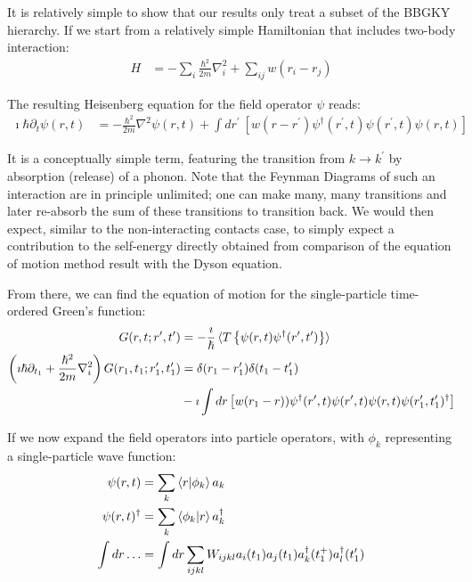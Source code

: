 It is relatively simple to show that our results only treat a subset of the BBGKY hierarchy. If we start from a relatively simple Hamiltonian that includes two-body interaction:
\begin{align*}
H &= -\sum_i \frac{\hbar^2}{2m} \nabla_i^2 + \sum_{ij} w(r_i - r_j)
\end{align*}

The resulting Heisenberg equation for the field operator $\psi$ reads:
\begin{align*}
\imath\hbar\partial_t \psi(r, t) &= -\frac{\hbar^2}{2m} \nabla^2 \psi(r,t) + \int dr^\prime \: \left[ w(r-r^\prime) \psi^\dagger (r^\prime, t) \psi(r^\prime,t) \psi(r,t)\right]
\end{align*}

It is a conceptually simple term, featuring the transition from $k\rightarrow k^\prime$ by absorption (release) of a phonon. Note that the Feynman Diagrams of such an interaction are in principle unlimited; one can make many, many transitions and later re-absorb the sum of these transitions to transition back. We would then expect, similar to the non-interacting contacts case, to simply expect a contribution to the self-energy directly obtained from comparison of the equation of motion method result with the Dyson equation.


From there, we can find the equation of motion for the single-particle time-ordered Green's function:
\begin{align*}
G(r,t;r^\prime,t^\prime) &= -\frac{\imath}{\hslash}\braket{T \left\{ \psi(r,t) \psi^\dagger(r^\prime,t^\prime)\right\}} \\
\left(\imath\hslash\partial_{t_1} + \frac{\hslash^2}{2m}\nabla_i^2\right) G(r_1, t_1; r_1^\prime, t_1^\prime) &= \delta(r_1 - r_1^\prime) \delta(t_1 - t_1^\prime) \\&- \imath \int dr\left[w(r_1 - r) ) \psi^\dagger (r^\prime, t) \psi(r^\prime,t) \psi(r,t) \psi(r_1^\prime, t_1^\prime)^\dagger\right]
\end{align*}

If we now expand the field operators into particle operators, with $\phi_k$ representing a single-particle wave function:
\begin{align*}
\psi(r, t) &= \sum_k \braket{r|\phi_k} a_k\\
\psi(r, t)^\dagger &= \sum_k \braket{\phi_k|r} a_k^\dagger \\
\int dr\ldots &= \int dr \sum_{ijkl} W_{ijkl} a_i(t_1) a_j (t_1) a_k^\dagger(t_1^+) a_l^\dagger(t_1^\prime)
\end{align*}


